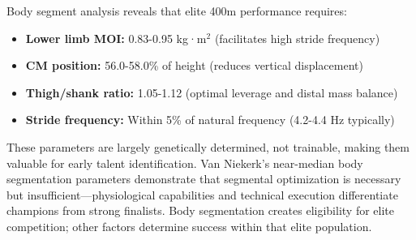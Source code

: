 Body segment analysis reveals that elite 400m performance requires:
\begin{itemize}
    \item \textbf{Lower limb MOI:} 0.83-0.95 kg·m$^2$ (facilitates high stride frequency)
    \item \textbf{CM position:} 56.0-58.0\% of height (reduces vertical displacement)
    \item \textbf{Thigh/shank ratio:} 1.05-1.12 (optimal leverage and distal mass balance)
    \item \textbf{Stride frequency:} Within 5\% of natural frequency (4.2-4.4 Hz typically)
\end{itemize}

These parameters are largely genetically determined, not trainable, making them valuable for early talent identification. Van Niekerk's near-median body segmentation parameters demonstrate that segmental optimization is necessary but insufficient—physiological capabilities and technical execution differentiate champions from strong finalists. Body segmentation creates eligibility for elite competition; other factors determine success within that elite population.
